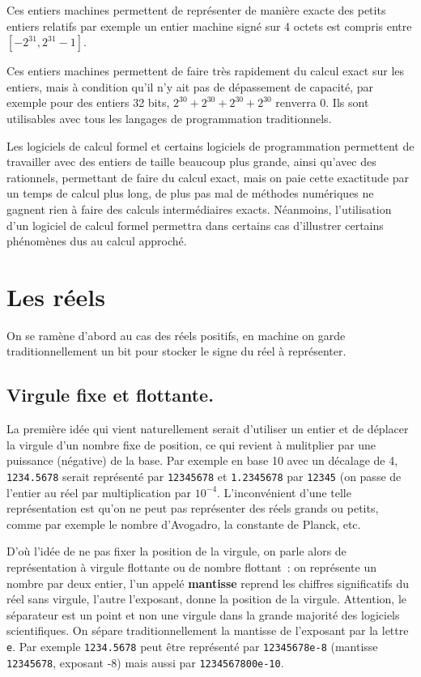 \documentclass[a4paper,11pt]{book}
\begin{document}
\begin{giacjshere}
Ces entiers machines permettent
de représenter de manière exacte des petits entiers relatifs 
par exemple un entier machine sign\'e sur 4 octets est
compris entre $[-2^{31},2^{31}-1]$. 

Ces entiers machines permettent de faire très rapidement
du calcul exact sur les
entiers, mais \`a condition qu'il n'y ait pas de d\'epassement
de capacit\'e, par exemple pour des entiers 32 bits, $2^{30}+2^{30}+2^{30}+2^{30}$
renverra 0. Ils sont utilisables avec tous les langages de
programmation traditionnels.

Les logiciels de calcul formel et certains logiciels
de programmation permettent de travailler avec
des entiers de taille beaucoup plus grande, ainsi qu'avec des
rationnels, permettant de faire du calcul exact, mais on paie
cette exactitude par un temps de calcul plus long, de plus
pas mal de m\'ethodes num\'eriques ne gagnent rien \`a
faire des calculs interm\'ediaires exacts. N\'eanmoins, l'utilisation
d'un logiciel de calcul formel permettra dans certains cas d'illustrer
certains ph\'enom\`enes dus au calcul approch\'e.

\section{Les r\'eels}
On se ram\`ene d'abord au cas des r\'eels positifs, en machine
on garde traditionnellement un bit pour stocker le signe du r\'eel
\`a repr\'esenter.

\subsection{Virgule fixe et flottante.}
La premi\`ere id\'ee qui vient naturellement serait d'utiliser
un entier et de d\'eplacer la virgule
d'un nombre fixe de position, ce qui revient \`a mulitplier
par une puissance (n\'egative) de la base. Par exemple en base 10 avec un
d\'ecalage de 4, \verb|1234.5678|
serait repr\'esent\'e par \verb|12345678| et \verb|1.2345678| par
\verb|12345| (on passe de l'entier au r\'eel par multiplication
par $10^{-4}$. L'inconv\'enient d'une telle repr\'esentation est
qu'on ne peut pas repr\'esenter des r\'eels grands ou petits,
comme par exemple le nombre d'Avogadro, la constante de Planck, etc.

D'o\`u l'id\'ee de ne pas fixer la position de la virgule, on parle
alors de repr\'esentation \`a virgule flottante ou de nombre flottant~: on
repr\'esente un nombre par deux entier, l'un appel\'e {\bf mantisse}
reprend les chiffres significatifs du r\'eel sans virgule, l'autre
l'exposant, donne la position de la virgule. Attention, le séparateur
est un point et non une virgule dans la grande
majorité des logiciels scientifiques.
On s\'epare
traditionnellement la mantisse de l'exposant par la lettre \verb|e|.
Par exemple \verb|1234.5678| peut \^etre repr\'esent\'e 
par \verb|12345678e-8| (mantisse \verb|12345678|, exposant -8)
mais aussi par \verb|1234567800e-10|.


\end{giacjshere}
\end{document}
